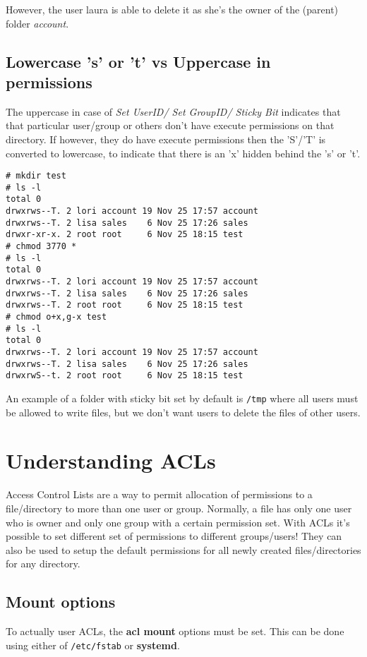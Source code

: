 \noindent
However, the user laura is able to delete it as she's the owner of the (parent) folder \textit{account}. 

\subsection{Lowercase 's' or 't' vs Uppercase in permissions}
The uppercase in case of \textit{Set UserID/ Set GroupID/ Sticky Bit} indicates that that particular user/group or others don't have execute permissions on that directory. If however, they do have execute permissions then the 'S'/'T' is converted to lowercase, to indicate that there is an 'x' hidden behind the 's' or 't'. 

\vspace{-15pt}
\begin{verbatim}
# mkdir test
# ls -l
total 0
drwxrws--T. 2 lori account 19 Nov 25 17:57 account
drwxrws--T. 2 lisa sales    6 Nov 25 17:26 sales
drwxr-xr-x. 2 root root     6 Nov 25 18:15 test
# chmod 3770 *
# ls -l
total 0
drwxrws--T. 2 lori account 19 Nov 25 17:57 account
drwxrws--T. 2 lisa sales    6 Nov 25 17:26 sales
drwxrws--T. 2 root root     6 Nov 25 18:15 test
# chmod o+x,g-x test
# ls -l
total 0
drwxrws--T. 2 lori account 19 Nov 25 17:57 account
drwxrws--T. 2 lisa sales    6 Nov 25 17:26 sales
drwxrwS--t. 2 root root     6 Nov 25 18:15 test
\end{verbatim}
\vspace{-10pt}

\noindent
An example of a folder with sticky bit set by default is \verb|/tmp| where all users must be allowed to write files, but we don't want users to delete the files of other users.

	\section{Understanding ACLs}
Access Control Lists are a way to permit allocation of permissions to a file/directory to more than one user or group. Normally, a file has only one user who is owner and only one group with a certain permission set. With ACLs it's possible to set different set of permissions to different groups/users! They can also be used to setup the default permissions for all newly created files/directories for any directory. 

\subsection{Mount options}
To actually user ACLs, the \textbf{acl mount} options must be set. This can be done using either of \verb|/etc/fstab| or \textbf{systemd}.

